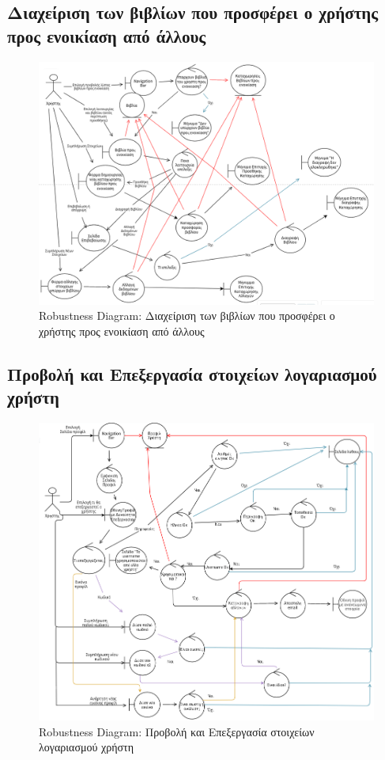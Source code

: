 \documentclass[12pt,a4paper]{article}
\begin{document}
\subsection{Διαχείριση των βιβλίων που προσφέρει ο χρήστης προς ενοικίαση από άλλους}
\begin{figure}[H]
	\includegraphics[width=\textwidth]{Manage User Book Listings Robustness.png}
	\caption{Robustness Diagram: Διαχείριση των βιβλίων που προσφέρει ο χρήστης προς ενοικίαση από άλλους}
	\label{Robustness Diagram: Διαχείριση των βιβλίων που προσφέρει ο χρήστης προς ενοικίαση από άλλους}
\end{figure}

\subsection{Προβολή και Επεξεργασία στοιχείων λογαριασμού χρήστη}
\begin{figure}[H]
	\includegraphics[width=\textwidth]{View and Edit User Account Details Robustness.png}
	\caption{Robustness Diagram: Προβολή και Επεξεργασία στοιχείων λογαριασμού χρήστη}
	\label{Robustness Diagram: Προβολή και Επεξεργασία στοιχείων λογαριασμού χρήστη}
\end{figure}
\end{document}
